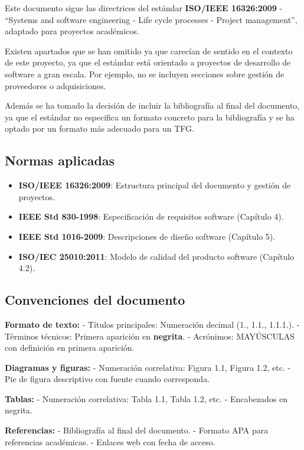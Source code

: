 \documentclass[12pt,a4paper,oneside]{report}
\providecommand{\tightlist}{%
  \setlength{\itemsep}{0pt}\setlength{\parskip}{0pt}}
\begin{document}
Este documento sigue las directrices del estándar \textbf{ISO/IEEE 16326:2009} - ``Systems and software engineering - Life cycle processes - Project management'', adaptado para proyectos académicos.

Existen apartados que se han omitido ya que carecían de sentido en el contexto de este proyecto, ya que el estándar está orientado a proyectos de desarrollo de software a gran escala. Por ejemplo, no se incluyen secciones sobre gestión de proveedores o adquisiciones.

Además se ha tomado la decisión de incluir la bibliografía al final del documento, ya que el estándar no especifica un formato concreto para la bibliografía y se ha optado por un formato más adecuado para un TFG.

\subsection{Normas aplicadas}\label{normas-aplicadas}

\begin{itemize}
\tightlist
\item
  \textbf{ISO/IEEE 16326:2009}: Estructura principal del documento y
  gestión de proyectos.
\item
  \textbf{IEEE Std 830-1998}: Especificación de requisitos software
  (Capítulo 4).
\item
  \textbf{IEEE Std 1016-2009}: Descripciones de diseño software
  (Capítulo 5).
\item
  \textbf{ISO/IEC 25010:2011}: Modelo de calidad del producto software
  (Capítulo 4.2).
\end{itemize}

\subsection{Convenciones del
documento}\label{convenciones-del-documento}

\textbf{Formato de texto:} - Títulos principales: Numeración decimal
(1., 1.1., 1.1.1.). - Términos técnicos: Primera aparición en
\textbf{negrita}. - Acrónimos: MAYÚSCULAS con definición en primera
aparición.

\textbf{Diagramas y figuras:} - Numeración correlativa: Figura 1.1,
Figura 1.2, etc. - Pie de figura descriptivo con fuente cuando
corresponda.

\textbf{Tablas:} - Numeración correlativa: Tabla 1.1, Tabla 1.2, etc. -
Encabezados en negrita.

\textbf{Referencias:} - Bibliografía al final del documento. - Formato
APA para referencias académicas. - Enlaces web con fecha de acceso.
\end{document}

